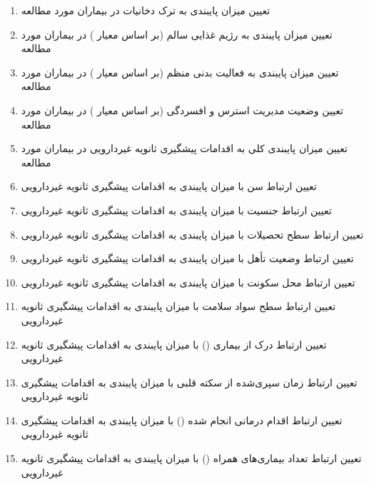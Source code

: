 \begin{enumerate}[label=\arabic*.]
    
\item تعیین میزان پایبندی به ترک دخانیات در بیماران مورد مطالعه

\item تعیین میزان پایبندی به رژیم غذایی سالم (بر اساس معیار ) در بیماران مورد مطالعه

\item تعیین میزان پایبندی به فعالیت بدنی منظم (بر اساس معیار ) در بیماران مورد مطالعه

\item تعیین وضعیت مدیریت استرس و افسردگی (بر اساس معیار ) در بیماران مورد مطالعه

\item تعیین میزان پایبندی کلی به اقدامات پیشگیری ثانویه غیردارویی در بیماران مورد مطالعه

\item تعیین ارتباط سن با میزان پایبندی به اقدامات پیشگیری ثانویه غیردارویی

\item تعیین ارتباط جنسیت با میزان پایبندی به اقدامات پیشگیری ثانویه غیردارویی

\item تعیین ارتباط سطح تحصیلات با میزان پایبندی به اقدامات پیشگیری ثانویه غیردارویی

\item تعیین ارتباط وضعیت تأهل با میزان پایبندی به اقدامات پیشگیری ثانویه غیردارویی

\item تعیین ارتباط محل سکونت با میزان پایبندی به اقدامات پیشگیری ثانویه غیردارویی

\item تعیین ارتباط سطح سواد سلامت با میزان پایبندی به اقدامات پیشگیری ثانویه غیردارویی

\item تعیین ارتباط درک از بیماری () با میزان پایبندی به اقدامات پیشگیری ثانویه غیردارویی

\item تعیین ارتباط زمان سپری‌شده از سکته قلبی با میزان پایبندی به اقدامات پیشگیری ثانویه غیردارویی

\item تعیین ارتباط اقدام درمانی انجام شده () با میزان پایبندی به اقدامات پیشگیری ثانویه غیردارویی

\item تعیین ارتباط تعداد بیماری‌های همراه () با میزان پایبندی به اقدامات پیشگیری ثانویه غیردارویی


\end{enumerate}
